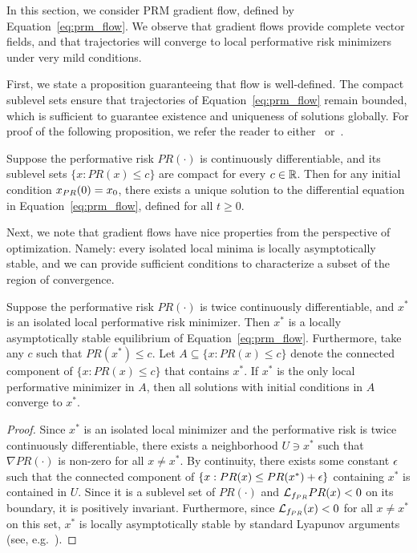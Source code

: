 
In this section, we consider PRM gradient flow, defined by Equation~\eqref{eq:prm_flow}. We observe that gradient flows provide complete vector fields, and that trajectories will converge to local performative risk minimizers under very mild conditions.

First, we state a proposition guaranteeing that flow is well-defined. The compact sublevel sets ensure that trajectories of Equation~\eqref{eq:prm_flow} remain bounded, which is sufficient to guarantee existence and uniqueness of solutions globally. For proof of the following proposition, we refer the reader to either~{\citet[Section 3.1]{Khalil:2001wj}} or~{\citet[Section 9.3]{Hirsch:2012tx}}.

\begin{proposition}

Suppose the performative risk $PR(\cdot)$ is continuously differentiable, and its sublevel sets $\{ x : PR(x) \le c \}$ are compact for every $c \in \mathbb{R}$. Then for any initial condition $x_{PR}(0) = x_0$, there exists a unique solution to the differential equation in Equation~\eqref{eq:prm_flow}, defined for all $t \ge 0$.

\end{proposition}

Next, we note that gradient flows have nice properties from the perspective of optimization. Namely: every isolated local minima is locally asymptotically stable, and we can provide sufficient conditions to characterize a subset of the region of convergence.

\begin{proposition}

Suppose the performative risk $PR(\cdot)$ is twice continuously differentiable, and $x^*$ is an isolated local performative risk minimizer. Then $x^*$ is a locally asymptotically stable equilibrium of Equation~\eqref{eq:prm_flow}. 
Furthermore, take any $c$ such that $PR(x^*) \le c$. Let $A \subseteq \{ x : PR(x) \le c \}$ denote the connected component of $\{ x : PR(x) \le c \}$ that contains $x^*$. If $x^*$ is the only local performative minimizer in $A$, then all solutions with initial conditions in $A$ converge to $x^*$.

\end{proposition}

\begin{proof}
Since $x^*$ is an isolated local minimizer and the performative risk is twice continuously differentiable, there exists a neighborhood $U \ni x^*$ such that $\nabla PR(\cdot)$ is non-zero for all $x \neq x^*$. By continuity, there exists some constant $\epsilon$ such that the connected component of $\{ x : PR(x) \le PR(x^*) + \epsilon \}$ containing $x^*$ is contained in $U$. Since it is a sublevel set of $PR(\cdot)$ and $\mathcal{L}_{f_{PR}}PR(x) < 0$ on its boundary, it is positively invariant. Furthermore, since $\mathcal{L}_{f_{PR}}(x) < 0$ for all $x \neq x^*$ on this set, $x^*$ is locally asymptotically stable by standard Lyapunov arguments (see, e.g.~\citet[Section 4]{Khalil:2001wj}).
\end{proof}

